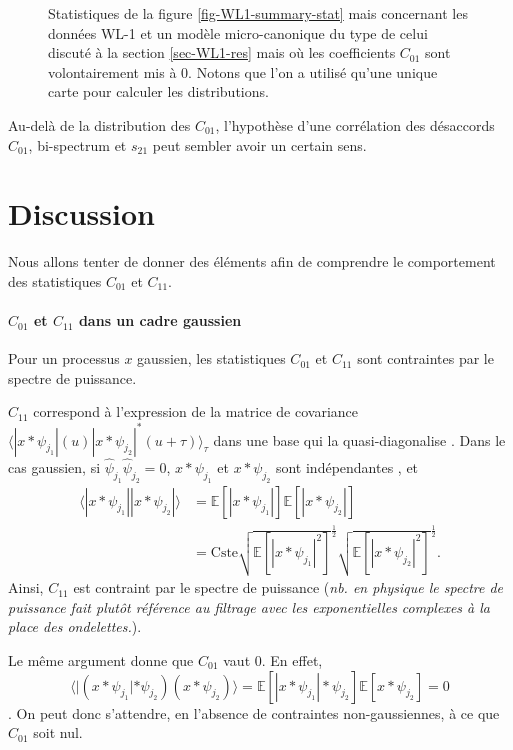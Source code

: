 \documentclass[12pt,twoside]{article}
\begin{document}
\begin{itemize}
\begin{figure}
\caption{Statistiques de la figure \ref{fig-WL1-summary-stat} mais concernant les données WL-1 et un modèle micro-canonique du type de celui discuté à la section \ref{sec-WL1-res} mais où les coefficients $C_{01}$ sont volontairement mis à 0. Notons que l'on a utilisé qu'une unique carte pour calculer les distributions.}
\label{fig-WL1-micro-C01scaling}
\end{figure}
Au-delà de la distribution des $C_{01}$, l'hypothèse d'une corrélation des désaccords $C_{01}$,  bi-spectrum et $s_{21}$ peut sembler avoir un certain sens.
\end{itemize}
%
\section{Discussion}\label{sec-discussion}
%
Nous allons tenter de donner des éléments afin de comprendre le comportement des statistiques $C_{01}$ et $C_{11}$.

\paragraph*{$C_{01}$ et $C_{11}$ dans un cadre gaussien}
Pour un processus $x$ gaussien, les statistiques $C_{01}$ et $C_{11}$ sont contraintes par le spectre de puissance.

$C_{11}$ correspond à l'expression de la matrice de covariance $\langle|x*\psi_{j_1}|(u)|x*\psi_{j_2}|^\ast(u+\tau)\rangle_{\tau}$ dans une base qui la quasi-diagonalise \cite{morel2023scale}. Dans le cas gaussien, si $\hat\psi_{j_1}\hat\psi_{j_2} = 0$, $x*\psi_{j_1}$ et $x*\psi_{j_2}$ sont indépendantes \cite{morel2023scale}, et  
\begin{align*}
\langle|x*\psi_{j_1}||x*\psi_{j_2}|\rangle &= \mathbb{E}[|x*\psi_{j_1}|]\mathbb{E}[|x*\psi_{j_2}|] \\
& = \text{Cste}\sqrt{\mathbb{E}[|x*\psi_{j_1}|^2]}^{\frac{1}{2}}\sqrt{\mathbb{E}[|x*\psi_{j_2}|^2]}^{\frac{1}{2}}.
\end{align*}
Ainsi, $C_{11}$ est contraint par le spectre de puissance (\textit{nb. en physique le spectre de puissance fait plutôt référence au filtrage avec les exponentielles complexes à la place des ondelettes.}). 

Le même argument donne que $C_{01}$ vaut $0$. En effet, 
$$
\langle |(x*\psi_{j_1}|*\psi_{j_2})(x*\psi_{j_2})\rangle = \mathbb{E}[|x*\psi_{j_1}|*\psi_{j_2}]\mathbb{E}[x*\psi_{j_2}] = 0
$$. 
On peut donc s'attendre, en l'absence de contraintes non-gaussiennes, à ce que $C_{01}$ soit nul.
\end{document}
